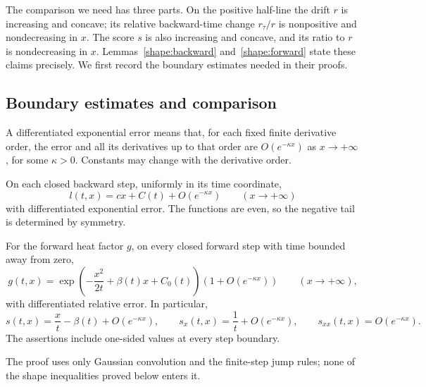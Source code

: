 The comparison we need has three parts.  On the positive half-line the
drift $r$ is increasing and concave; its relative backward-time change
$r_\tau/r$ is nonpositive and nondecreasing in $x$.  The score $s$ is also
increasing and concave, and its ratio to $r$ is nondecreasing in $x$.
Lemmas~\ref{shape:backward} and~\ref{shape:forward} state these claims
precisely.  We first record the boundary estimates needed in their proofs.

\subsection{Boundary estimates and comparison}

A differentiated exponential error means that, for each fixed finite
derivative order, the error and all its derivatives up to that order
are $O(e^{-\kappa x})$ as $x\to+\infty$, for some $\kappa>0$.
Constants may change with the derivative order.

\begin{lemma}\label{tail:class}
On each closed backward step, uniformly in its time coordinate,
\begin{equation}\label{tail:backward}
 l(t,x)=cx+C(t)+O(e^{-\kappa x})\qquad(x\to+\infty)
\end{equation}
with differentiated exponential error.  The functions are even, so the
negative tail is determined by symmetry.

For the forward heat factor $g$, on every closed forward step with
time bounded away from zero,
\begin{equation}\label{tail:forward}
 g(t,x)=\exp\left(-\frac{x^2}{2t}+\beta(t)x+C_0(t)\right)
                 (1+O(e^{-\kappa x}))\qquad(x\to+\infty),
\end{equation}
with differentiated relative error.  In particular,
\begin{equation}\label{tail:score}
 s(t,x)=\frac{x}{t}-\beta(t)+O(e^{-\kappa x}),\qquad
 s_x(t,x)=\frac1t+O(e^{-\kappa x}),\qquad
 s_{xx}(t,x)=O(e^{-\kappa x}).
\end{equation}
The assertions include one-sided values at every step boundary.
\end{lemma}

The proof uses only Gaussian convolution and the finite-step jump rules;
none of the shape inequalities proved below enters it.

